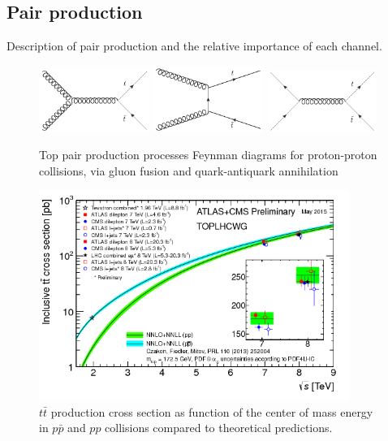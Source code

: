\subsection{Pair production}
\label{subsec:toppair}

Description of pair production and the relative importance of each channel.

\begin{figure}[!Hhtbp]
  \begin{center}
    \includegraphics[width=0.32\textwidth]{figs/Gluon_fusion_top_pair.jpg}
    \includegraphics[width=0.32\textwidth]{figs/Gluon_tchannel_top_pair.jpg}
    \includegraphics[width=0.32\textwidth]{figs/Quarks_schannel_top_pair.jpg}
    \caption{Top pair production processes Feynman diagrams for proton-proton collisions, via gluon fusion and quark-antiquark annihilation}
    \label{fig:PairProduction}
  \end{center}
\end{figure}

\begin{figure}[!Hhtbp]
  \begin{center}
    \includegraphics[width=0.9\textwidth]{figs/toplhcwg_ttxsec_sqrts_may2015.png}
    \caption{$t\bar{t}$ production cross section as function of the center of mass energy in $p\bar{p}$ and $pp$ collisions compared to theoretical predictions.}
    \label{fig:PairProduction}
  \end{center}
\end{figure}

